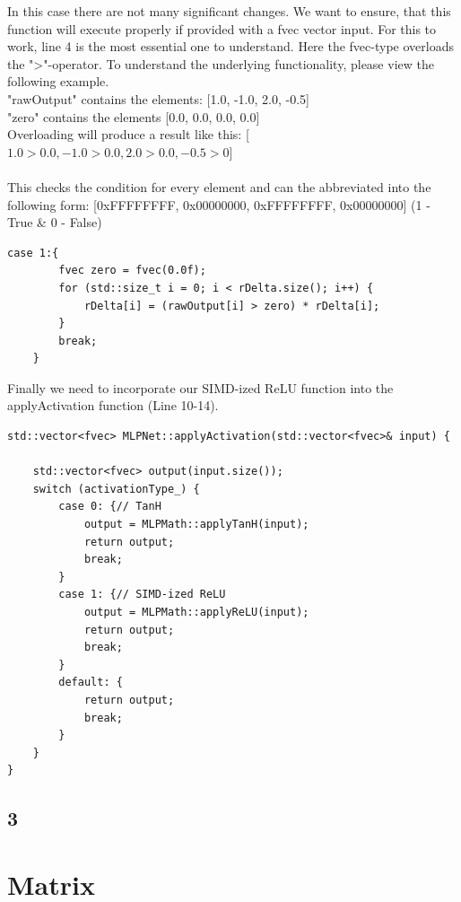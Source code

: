 \documentclass{article}
\begin{document}
\noindent In this case there are not many significant changes.
We want to ensure, that this function will execute properly if provided with a fvec vector input.
For this to work, line 4 is the most essential one to understand. Here the fvec-type overloads the ">"-operator.
To understand the underlying functionality, please view the following example. \\

\noindent "rawOutput" contains the elements: [1.0, -1.0, 2.0, -0.5] \\
"zero" contains the elements [0.0, 0.0, 0.0, 0.0] \\

\noindent Overloading will produce a result like this:
[$1.0>0.0,-1.0>0.0,2.0>0.0,-0.5>0$] \\\\
\noindent This checks the condition for every element and can the abbreviated into the following form: [0xFFFFFFFF, 0x00000000, 0xFFFFFFFF, 0x00000000]
(1 - True \& 0 - False)

\begin{lstlisting}[caption=backPropActivation]
    case 1:{
        fvec zero = fvec(0.0f);
        for (std::size_t i = 0; i < rDelta.size(); i++) {
            rDelta[i] = (rawOutput[i] > zero) * rDelta[i];
        }
        break;
    }
\end{lstlisting}

\newpage

\noindent Finally we need to incorporate our SIMD-ized ReLU function into the applyActivation function (Line 10-14).
\begin{lstlisting}[caption=applyActivation]
    std::vector<fvec> MLPNet::applyActivation(std::vector<fvec>& input) {

    std::vector<fvec> output(input.size());
    switch (activationType_) {
        case 0: {// TanH
            output = MLPMath::applyTanH(input);
            return output;
            break;
        }
        case 1: {// SIMD-ized ReLU
            output = MLPMath::applyReLU(input);
            return output;
            break;
        }
        default: {
            return output;
            break;
        }
    }
}
\end{lstlisting}


\subsection*{3}
\section{Matrix}
\end{document}
